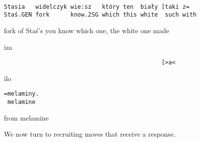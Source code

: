 \documentclass[output=paper]{langsci/langscibook}
\begin{document}
%
\begin{mdframednoverticalspace}[style=firstfoc]
\begin{transbox}{9}{~}
\begin{verbatim}
Stasia   widelczyk wie:sz   który ten  biały [taki z=
Staś.GEN fork      know.2SG which this white  such with
\end{verbatim}
fork of Staś’s you know which one, the white one made
\end{transbox}
\end{mdframednoverticalspace}
%
\begin{transbox}{10}{iza}
\begin{verbatim}
                                             [>a<
\end{verbatim}
\end{transbox}
%
\begin{mdframednoverticalspace}[style=firstfoc]
\begin{transbox}{11}{ilo}
\begin{verbatim}
=melaminy.
 melamine
\end{verbatim}
\hspace{0.07cm} from melamine
\end{transbox}
\end{mdframednoverticalspace}
%
\begin{mdframednoverticalspace}[style=secondfoc]
\end{mdframednoverticalspace}

We now turn to recruiting moves that receive a response.
\end{document}
